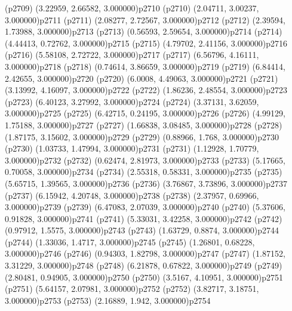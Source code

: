 \psdot(p2709)
\psPoint(3.22959, 2.66582, 3.000000){p2710}
\psdot(p2710)
\psPoint(2.04711, 3.00237, 3.000000){p2711}
\psdot(p2711)
\psPoint(2.08277, 2.72567, 3.000000){p2712}
\psdot(p2712)
\psPoint(2.39594, 1.73988, 3.000000){p2713}
\psdot(p2713)
\psPoint(0.56593, 2.59654, 3.000000){p2714}
\psdot(p2714)
\psPoint(4.44413, 0.72762, 3.000000){p2715}
\psdot(p2715)
\psPoint(4.79702, 2.41156, 3.000000){p2716}
\psdot(p2716)
\psPoint(5.58108, 2.72722, 3.000000){p2717}
\psdot(p2717)
\psPoint(6.56796, 4.16111, 3.000000){p2718}
\psdot(p2718)
\psPoint(0.74614, 3.86659, 3.000000){p2719}
\psdot(p2719)
\psPoint(6.84414, 2.42655, 3.000000){p2720}
\psdot(p2720)
\psPoint(6.0008, 4.49063, 3.000000){p2721}
\psdot(p2721)
\psPoint(3.13992, 4.16097, 3.000000){p2722}
\psdot(p2722)
\psPoint(1.86236, 2.48554, 3.000000){p2723}
\psdot(p2723)
\psPoint(6.40123, 3.27992, 3.000000){p2724}
\psdot(p2724)
\psPoint(3.37131, 3.62059, 3.000000){p2725}
\psdot(p2725)
\psPoint(6.42715, 0.24195, 3.000000){p2726}
\psdot(p2726)
\psPoint(4.99129, 1.75188, 3.000000){p2727}
\psdot(p2727)
\psPoint(1.66838, 3.08485, 3.000000){p2728}
\psdot(p2728)
\psPoint(1.87175, 3.15602, 3.000000){p2729}
\psdot(p2729)
\psPoint(0.88966, 1.768, 3.000000){p2730}
\psdot(p2730)
\psPoint(1.03733, 1.47994, 3.000000){p2731}
\psdot(p2731)
\psPoint(1.12928, 1.70779, 3.000000){p2732}
\psdot(p2732)
\psPoint(0.62474, 2.81973, 3.000000){p2733}
\psdot(p2733)
\psPoint(5.17665, 0.70058, 3.000000){p2734}
\psdot(p2734)
\psPoint(2.55318, 0.58331, 3.000000){p2735}
\psdot(p2735)
\psPoint(5.65715, 1.39565, 3.000000){p2736}
\psdot(p2736)
\psPoint(3.76867, 3.73896, 3.000000){p2737}
\psdot(p2737)
\psPoint(6.15942, 4.20748, 3.000000){p2738}
\psdot(p2738)
\psPoint(2.37957, 0.69966, 3.000000){p2739}
\psdot(p2739)
\psPoint(6.47083, 2.07039, 3.000000){p2740}
\psdot(p2740)
\psPoint(5.37606, 0.91828, 3.000000){p2741}
\psdot(p2741)
\psPoint(5.33031, 3.42258, 3.000000){p2742}
\psdot(p2742)
\psPoint(0.97912, 1.5575, 3.000000){p2743}
\psdot(p2743)
\psPoint(1.63729, 0.8874, 3.000000){p2744}
\psdot(p2744)
\psPoint(1.33036, 1.4717, 3.000000){p2745}
\psdot(p2745)
\psPoint(1.26801, 0.68228, 3.000000){p2746}
\psdot(p2746)
\psPoint(0.94303, 1.82798, 3.000000){p2747}
\psdot(p2747)
\psPoint(1.87152, 3.31229, 3.000000){p2748}
\psdot(p2748)
\psPoint(6.21878, 0.67822, 3.000000){p2749}
\psdot(p2749)
\psPoint(2.80481, 0.94905, 3.000000){p2750}
\psdot(p2750)
\psPoint(3.5167, 4.10951, 3.000000){p2751}
\psdot(p2751)
\psPoint(5.64157, 2.07981, 3.000000){p2752}
\psdot(p2752)
\psPoint(3.82717, 3.18751, 3.000000){p2753}
\psdot(p2753)
\psPoint(2.16889, 1.942, 3.000000){p2754}
